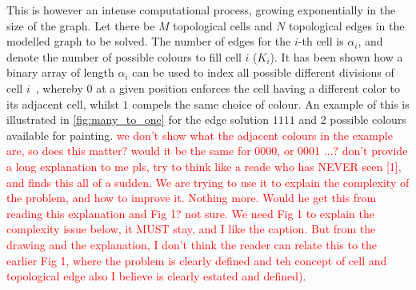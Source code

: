 \documentclass[conference]{IEEEtran}
\begin{document}

This is however an intense computational process, growing exponentially in the size of the graph. Let there be $M$ topological cells and $N$ topological edges in the modelled graph to be solved. The number of edges for the $i$-th cell is $\alpha_i$, and denote the number of possible colours to fill cell $i$ ($K_i$).   
It has been shown how a binary array of length $\alpha_i$ can be used to index all possible different divisions of cell $i$~\cite{Yang2020Cellular}, whereby 
$0$ at a given position enforces the cell having a different color to its adjacent cell, whilst $1$ compels the same choice of colour. An example of this is illustrated in \ref{fig:many_to_one} for the edge solution $1111$ and 2 possible colours available for painting. \textcolor{red}{we don't show what the adjacent colours in the example are, so does this matter? would it be the same for 0000, or 0001 ...? don't provide a long explanation to me pls, try to think like a reade who has NEVER seen [1], and finds this all of a sudden. We are trying to use it to explain the complexity of the problem, and how to improve it. Nothing more. Would he get this from reading this explanation and Fig 1? not sure. We need Fig 1 to explain the complexity issue below, it MUST stay, and I like the caption. But from the drawing and the explanation, I don't think the reader can relate this to the earlier Fig 1, where the problem is clearly defined and teh concept of cell and topological edge also I believe is clearly estated and defined).}
\end{document}
